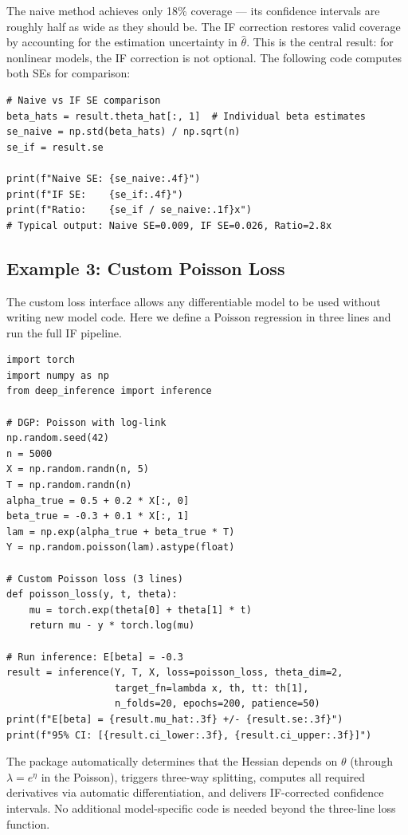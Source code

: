 \noindent The naive method achieves only 18\% coverage --- its confidence intervals are roughly half as wide as they should be. The IF correction restores valid coverage by accounting for the estimation uncertainty in $\hat{\theta}$. This is the central result: for nonlinear models, the IF correction is not optional. The following code computes both SEs for comparison:

\begin{lstlisting}
# Naive vs IF SE comparison
beta_hats = result.theta_hat[:, 1]  # Individual beta estimates
se_naive = np.std(beta_hats) / np.sqrt(n)
se_if = result.se

print(f"Naive SE: {se_naive:.4f}")
print(f"IF SE:    {se_if:.4f}")
print(f"Ratio:    {se_if / se_naive:.1f}x")
# Typical output: Naive SE=0.009, IF SE=0.026, Ratio=2.8x
\end{lstlisting}

\subsection{Example 3: Custom Poisson Loss}

The custom loss interface allows any differentiable model to be used without writing new model code. Here we define a Poisson regression in three lines and run the full IF pipeline.

\begin{lstlisting}
import torch
import numpy as np
from deep_inference import inference

# DGP: Poisson with log-link
np.random.seed(42)
n = 5000
X = np.random.randn(n, 5)
T = np.random.randn(n)
alpha_true = 0.5 + 0.2 * X[:, 0]
beta_true = -0.3 + 0.1 * X[:, 1]
lam = np.exp(alpha_true + beta_true * T)
Y = np.random.poisson(lam).astype(float)

# Custom Poisson loss (3 lines)
def poisson_loss(y, t, theta):
    mu = torch.exp(theta[0] + theta[1] * t)
    return mu - y * torch.log(mu)

# Run inference: E[beta] = -0.3
result = inference(Y, T, X, loss=poisson_loss, theta_dim=2,
                   target_fn=lambda x, th, tt: th[1],
                   n_folds=20, epochs=200, patience=50)
print(f"E[beta] = {result.mu_hat:.3f} +/- {result.se:.3f}")
print(f"95% CI: [{result.ci_lower:.3f}, {result.ci_upper:.3f}]")
\end{lstlisting}

The package automatically determines that the Hessian depends on $\theta$ (through $\lambda = e^\eta$ in the Poisson), triggers three-way splitting, computes all required derivatives via automatic differentiation, and delivers IF-corrected confidence intervals. No additional model-specific code is needed beyond the three-line loss function.
